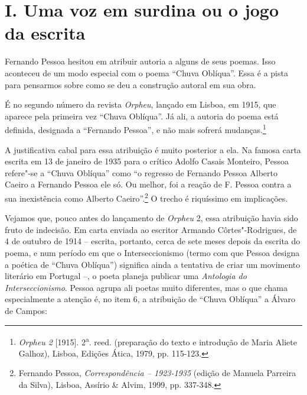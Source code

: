 \bigskip


\section*{I. Uma voz em surdina ou o jogo da escrita}

Fernando Pessoa hesitou em atribuir autoria a alguns de seus poemas.
Isso aconteceu de um modo especial com o poema ``Chuva Oblíqua''. Essa é
a pista para pensarmos sobre como se deu a construção autoral em sua
obra.

É no segundo número da revista \emph{Orpheu}, lançado em Lisboa, em
1915, que aparece pela primeira vez ``Chuva Oblíqua''. Já ali, a autoria
do poema está definida, designada a ``Fernando Pessoa'', e não mais
sofrerá mudanças.\footnote{\emph{Orpheu 2} {[}1915{]}.
  2\textsuperscript{a}. reed. (preparação do texto e introdução de Maria
  Aliete Galhoz), Lisboa, Edições Ática, 1979, pp. 115-123.}

A justificativa cabal para essa atribuição é muito posterior a ela. Na
famosa carta escrita em 13 de janeiro de 1935 para o crítico Adolfo
Casais Monteiro, Pessoa refere"-se a ``Chuva Oblíqua'' como ``o regresso
de Fernando Pessoa Alberto Caeiro a Fernando Pessoa ele só. Ou melhor,
foi a reação de F. Pessoa contra a sua inexistência como Alberto
Caeiro''.\footnote{Fernando Pessoa, \emph{Correspondência -- 1923-1935}
  (edição de Manuela Parreira da Silva), Lisboa, Assírio \& Alvim, 1999,
  pp. 337-348.} O trecho é riquíssimo em implicações.

Vejamos que, pouco antes do lançamento de \emph{Orpheu} 2, essa
atribuição havia sido fruto de indecisão. Em carta enviada ao
escritor Armando Côrtes"-Rodrigues, de 4 de outubro de 1914 -- escrita,
portanto, cerca de sete meses depois da escrita do poema, e num período
em que o Interseccionismo (termo com que Pessoa designa a poética de
``Chuva Oblíqua'') significa ainda a tentativa de criar um movimento
literário em Portugal --, o poeta planeja publicar uma \emph{Antologia
do Interseccionismo}. Pessoa agrupa ali poetas muito diferentes, mas o
que chama especialmente a atenção é, no item 6, a atribuição de ``Chuva
Oblíqua'' a Álvaro de Campos:

